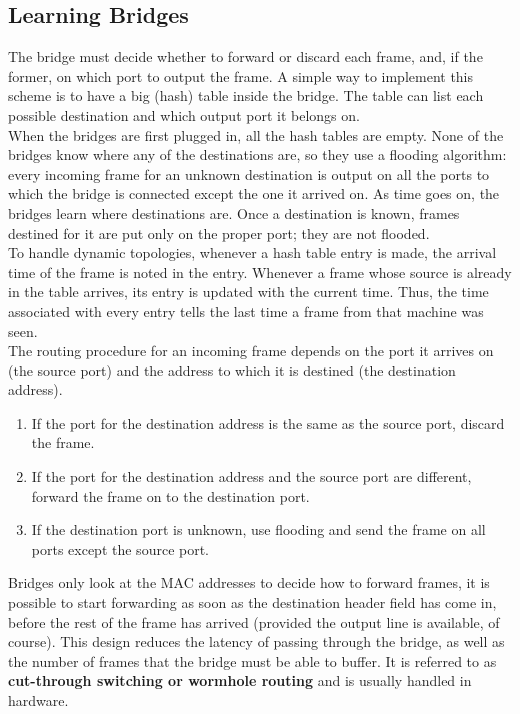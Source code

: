 \documentclass[a4paper,oneside]{book}
\begin{document}
\subsection{Learning Bridges}
The bridge must decide whether to forward or discard each frame, and, if the former, on which port to output the frame. A simple way to implement this scheme is to have a big (hash) table inside the bridge. The table can list each possible destination and which output port it belongs on. \\
When the bridges are first plugged in, all the hash tables are empty. None of the bridges know where any of the destinations are, so they use a flooding algorithm: every incoming frame for an unknown destination is output on all the ports to which the bridge is connected except the one it arrived on. As time goes on, the bridges learn where destinations are. Once a destination is known, frames
destined for it are put only on the proper port; they are not flooded.\\
To handle dynamic topologies, whenever a hash table entry is made, the arrival time of the frame is noted in the entry. Whenever a frame whose source is already in the table arrives, its entry is updated with the current time. Thus, the time associated with every entry tells the last time a frame from that machine was seen.\\
The routing procedure for an incoming frame depends on the port it arrives on (the source port) and the address to which it is destined (the destination address).
\begin{enumerate}
\item If the port for the destination address is the same as the source port, discard the frame.
\item If the port for the destination address and the source port are different, forward the frame on to the destination port.
\item If the destination port is unknown, use flooding and send the frame on all ports except the source port.
\end{enumerate}
Bridges only look at the MAC addresses to decide how to forward frames, it is possible to start forwarding as soon as the destination header field has come in, before the rest of the frame has arrived (provided the output line is available, of course). This design reduces the latency of passing through the bridge, as well as the number of frames that the bridge must be able to buffer. It is referred to as \textbf{cut-through switching or wormhole routing} and is usually handled in hardware.
\end{document}
